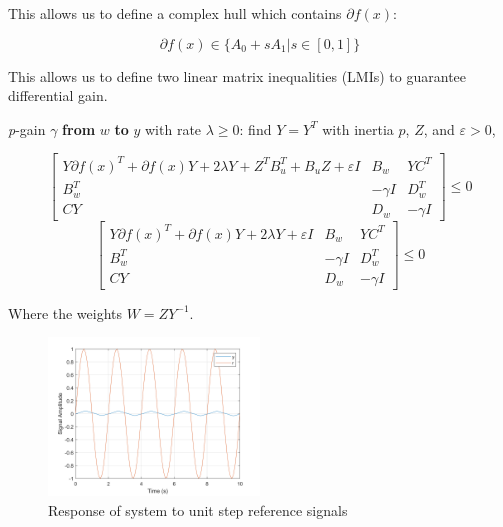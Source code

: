 \documentclass{article}
\begin{document}
This allows us to define a complex hull which contains $\partial f(x)$:

\begin{equation}
    \partial f(x) \in \{ A_0 + sA_1 | s \in [0,1]\}
\end{equation}

This allows us to define two linear matrix inequalities (LMIs) to guarantee differential gain. 

\textit{p}-gain $\gamma$ \textbf{from} $w$ \textbf{to} $y$ with rate $\lambda \geq 0$: find $Y = Y^T$ with inertia $p$, $Z$, and $\varepsilon > 0$,

\begin{equation}
    \left[
    \begin{array}{ccc}
    Y \partial f(x)^T + \partial f(x) Y + 2 \lambda Y + Z^T B_u^T + B_u Z + \varepsilon I & B_w & YC^T \\
    B_w^T & -\gamma I & D_w^T \\
    CY & D_w & -\gamma I
    \end{array}
    \right] \leq 0
\end{equation}
\begin{equation}
    \left[
    \begin{array}{ccc}
    Y \partial f(x)^T + \partial f(x) Y + 2 \lambda Y + \varepsilon I & B_w & YC^T \\
    B_w^T & -\gamma I & D_w^T \\
    CY & D_w & -\gamma I
    \end{array}
    \right] \leq 0
\end{equation}

Where the weights $W = ZY^{-1}$.


\begin{figure}[H]
    \centering
    \includegraphics[width=0.5\textwidth]{figures/11_harmonic_reference.png}
    \caption{Response of system to unit step reference signals}
    \label{fig:11_step}
\end{figure}
\end{document}
